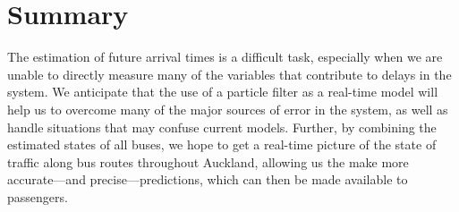 \documentclass[12pt,a4paper]{article}
\newcommand{\pf}{particle filter}
\begin{document}
\section{Summary}




The estimation of future arrival times is a difficult task,
especially when we are unable to directly measure many of the 
variables that contribute to delays in the system.
We anticipate that the use of a \pf{} as a real-time model will
help us to overcome many of the major sources of error in the system,
as well as handle situations that may confuse current models.
Further, by combining the estimated states of all buses,
we hope to get a real-time picture of the state of traffic along bus routes throughout Auckland,
allowing us the make more accurate---and precise---predictions,
which can then be made available to passengers.














\end{document}
